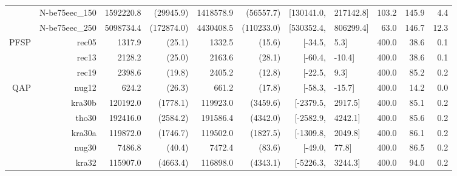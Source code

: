 \documentclass[sigconf,dvipsnames]{acmart}
\begin{document}
\begin{table}[tb]
{\begin{tabular}{r@{\hskip -2ex}*{5}{r}rl@{\hskip -2ex}*{3}{r}}
& N-be75eec\_150 & 1592220.8           & (29945.9)          & 1418578.9          & (56557.7)         & [130141.0,           & 217142.8]           & 103.2        & 145.9 & 4.4  \\
& N-be75eec\_250 & 5098734.4           & (172874.0)         & 4430408.5          & (110233.0)        & [530352.4,           & 806299.4]           & 63.0         & 146.7 & 12.3 \\\midrule
PFSP
& rec05          & 1317.9              & (25.1)             & 1332.5             & (15.6)            & [-34.5,              & 5.3]                & 400.0        & 38.6  & 0.1  \\
& rec13          & 2128.2              & (25.0)             & 2163.6             & (28.1)            & [-60.4,              & -10.4]              & 400.0        & 38.6  & 0.1  \\
& rec19          & 2398.6              & (19.8)             & 2405.2             & (12.8)            & [-22.5,              & 9.3]                & 400.0        & 85.2  & 0.2  \\\midrule
QAP
& nug12          & 624.2               & (26.3)             & 661.2              & (17.8)            & [-58.3,              & -15.7]              & 400.0        & 14.2  & 0.0  \\
& kra30b         & 120192.0            & (1778.1)           & 119923.0           & (3459.6)          & [-2379.5,            & 2917.5]             & 400.0        & 85.1  & 0.2  \\
& tho30          & 192416.0            & (2584.2)           & 191586.4           & (4342.0)          & [-2582.9,            & 4242.1]             & 400.0        & 85.6  & 0.2  \\
& kra30a         & 119872.0            & (1746.7)           & 119502.0           & (1827.5)          & [-1309.8,            & 2049.8]             & 400.0        & 86.1  & 0.2  \\
& nug30          & 7486.8              & (40.4)             & 7472.4             & (83.6)            & [-49.0,              & 77.8]               & 400.0        & 86.5  & 0.2  \\
& kra32          & 115907.0            & (4663.4)           & 116898.0           & (4343.1)          & [-5226.3,            & 3244.3]             & 400.0        & 94.0  & 0.2  \\
\bottomrule
\end{tabular}}
\vspace*{-1em}
 \end{table}
\end{document}
